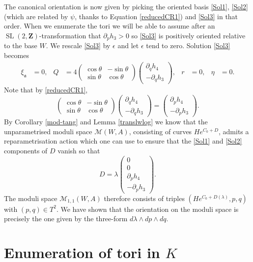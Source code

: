 \documentclass[11pt]{amsart}
\newcommand{\mM}{\mathcal{M}}
\newcommand{\ZZ}{\mathbf{Z}}
\newcommand{\WW}{W}
\renewcommand{\aa}{\mathfrak{a}}
\newcommand{\orvar}{Q}
\newcommand{\OP}{\operatorname}
\numberwithin{equation}{section}
\theoremstyle{definition}
\theoremstyle{remark}
\begin{document}
The canonical orientation is now given by picking the oriented basis \eqref{Sol1}, \eqref{Sol2} (which are related by $\psi$, thanks to Equation \eqref{reducedCR1}) and \eqref{Sol3} in that order. When we enumerate the tori we will be able to assume after an $\OP{SL}(2,\ZZ)$-transformation that $\partial_ph_3>0$ so \eqref{Sol3} is positively oriented relative to the base $\WW$. We rescale \eqref{Sol3} by $\epsilon$ and let $\epsilon$ tend to zero. Solution \eqref{Sol3} becomes
\begin{align*}\xi_{\aa}&=0,&\orvar&=4\left(\begin{array}{cc}\cos\theta& -\sin\theta\\ \sin\theta&\cos\theta\end{array}\right)\left(\begin{array}{c}\partial_qh_4\\ -\partial_qh_3\end{array}\right),&r&=0,&\eta&=0.\end{align*}
Note that by \eqref{reducedCR1},
\[\left(\begin{array}{cc}\cos\theta& -\sin\theta\\ \sin\theta&\cos\theta\end{array}\right)\left(\begin{array}{c}\partial_qh_4\\ -\partial_qh_3\end{array}\right)=\left(\begin{array}{c}\partial_ph_4\\ -\partial_ph_3\end{array}\right).\]
By Corollary \ref{mod-tang} and Lemma \ref{translwlog} we know that the unparametrised moduli space $\mM(\WW,A)$, consisting of curves $He^{C_0+D}$, admits a reparametrisation action which one can use to ensure that the \eqref{Sol1} and \eqref{Sol2} components of $D$ vanish so that
\[D=\lambda\left(\begin{array}{c}
0\\
0\\
\partial_ph_4\\
-\partial_ph_3
\end{array}\right).\]
The moduli space $\mM_{1,1}(\WW,A)$ therefore consists of triples $(He^{C_0+D(\lambda)},p,q)$  with $(p,q)\in T^2$. We have shown that the orientation on the moduli space is precisely the one given by the three-form $d\lambda\wedge dp\wedge dq$.


\section{Enumeration of tori in $K$}\label{enumtori}
\end{document}
